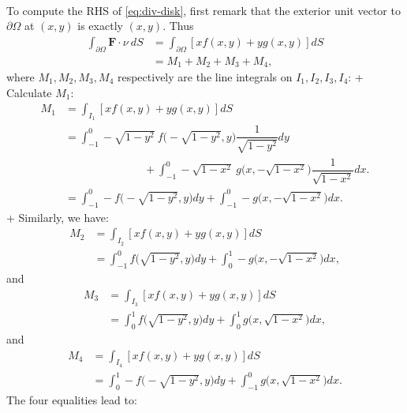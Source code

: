 \begin{problem}
\begin{solution}
\begin{enumerate}
\begin{align*}
    \end{align*}
    To compute the RHS of \eqref{eq:div-disk}, first remark that the exterior unit vector to $\partial\Omega$ at $(x,y)$ is exactly $(x,y)$.
    Thus 
    \begin{align*}
        \displaystyle\int_{\partial\Omega} \mathbf{F}\cdot \nu\ dS &= \displaystyle\int_{\partial\Omega} \left[xf(x,y) + yg(x,y)\right] dS \\
        &= M_1 + M_2 + M_3 + M_4,
    \end{align*}
    where $M_1,M_2,M_3,M_4$ respectively are the line integrals on $I_1, I_2, I_3, I_4$:
    + Calculate $M_1$:
    \begin{align*}
        M_1 &= \displaystyle\int_{I_1} \left[xf(x,y) + yg(x,y)\right] dS \\
        &= \displaystyle\int_{-1}^0 -\sqrt{1-y^2}\  f\Big( -\sqrt{1-y^2},y\Big)\dfrac{1}{\sqrt{1-y^2}} dy \\ 
        &\hspace{3cm} + \displaystyle\int_{-1}^0 -\sqrt{1-x^2}\ g\Big(x, -\sqrt{1-x^2}\Big)\dfrac{1}{\sqrt{1-x^2}} dx.\\
        &= \displaystyle\int_{-1}^0 - f\Big( -\sqrt{1-y^2},y\Big) dy + \displaystyle\int_{-1}^0 -g\Big(x, -\sqrt{1-x^2}\Big) dx.
    \end{align*}
    + Similarly, we have:
    \begin{align*}
        M_2 &= \displaystyle\int_{I_2} \left[xf(x,y) + yg(x,y)\right] dS \\
        &= \displaystyle\int_{-1}^0  f\Big( \sqrt{1-y^2},y\Big) dy + \displaystyle\int_{0}^1 -g\Big(x, -\sqrt{1-x^2}\Big) dx,
    \end{align*}
    and 
     \begin{align*}
        M_3 &= \displaystyle\int_{I_3} \left[xf(x,y) + yg(x,y)\right] dS \\
        &= \displaystyle\int_{0}^1 f\Big( \sqrt{1-y^2},y\Big) dy + \displaystyle\int_{0}^1 g\Big(x, \sqrt{1-x^2}\Big) dx,
    \end{align*}
    and 
     \begin{align*}
        M_4 &= \displaystyle\int_{I_4} \left[xf(x,y) + yg(x,y)\right] dS \\
        &= \displaystyle\int_{0}^1  -f\Big( -\sqrt{1-y^2},y\Big) dy + \displaystyle\int_{-1}^0 g\Big(x, \sqrt{1-x^2}\Big) dx.
    \end{align*}
    The four equalities lead to:
    \begin{align*}

\end{align*}
\end{enumerate}
\end{solution}
\end{problem}

